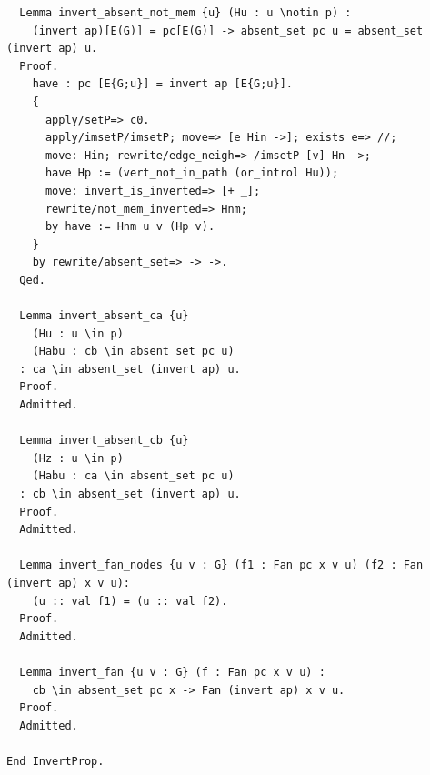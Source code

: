 \begin{verbatim}
  Lemma invert_absent_not_mem {u} (Hu : u \notin p) :
    (invert ap)[E(G)] = pc[E(G)] -> absent_set pc u = absent_set (invert ap) u.
  Proof. 
    have : pc [E{G;u}] = invert ap [E{G;u}].
    {
      apply/setP=> c0.
      apply/imsetP/imsetP; move=> [e Hin ->]; exists e=> //;
      move: Hin; rewrite/edge_neigh=> /imsetP [v] Hn ->;
      have Hp := (vert_not_in_path (or_introl Hu));
      move: invert_is_inverted=> [+ _];
      rewrite/not_mem_inverted=> Hnm;
      by have := Hnm u v (Hp v).  
    }
    by rewrite/absent_set=> -> ->.
  Qed.

  Lemma invert_absent_ca {u}
    (Hu : u \in p)
    (Habu : cb \in absent_set pc u)
  : ca \in absent_set (invert ap) u.
  Proof.
  Admitted.

  Lemma invert_absent_cb {u}
    (Hz : u \in p)
    (Habu : ca \in absent_set pc u)
  : cb \in absent_set (invert ap) u.
  Proof.
  Admitted.

  Lemma invert_fan_nodes {u v : G} (f1 : Fan pc x v u) (f2 : Fan (invert ap) x v u):
    (u :: val f1) = (u :: val f2).
  Proof.
  Admitted.

  Lemma invert_fan {u v : G} (f : Fan pc x v u) : 
    cb \in absent_set pc x -> Fan (invert ap) x v u.
  Proof.
  Admitted.

End InvertProp.
\end{verbatim}

